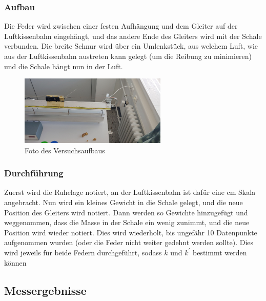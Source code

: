 \documentclass{article}
\begin{document}
          \subsubsection{Aufbau}
              Die Feder wird zwischen einer festen Aufhängung und dem Gleiter auf der Luftkissenbahn eingehängt, und das andere Ende des Gleiters wird mit der Schale verbunden.
              Die breite Schnur wird über ein Umlenkstück, aus welchem Luft, wie aus der Luftkissenbahn austreten kann gelegt (um die Reibung zu minimieren) und die Schale hängt nun in der Luft.
              \begin{figure}[ht]\label{fig:foto_federkonstante}
                \centering
                \includegraphics[width=7cm]{fotos/federkonstante.jpg}
                \caption{Foto des Versuchsaufbaus}
            \end{figure}
          \subsubsection{Durchführung}
              Zuerst wird die Ruhelage notiert, an der Luftkissenbahn ist dafür eine cm Skala angebracht.
              Nun wird ein kleines Gewicht in die Schale gelegt, und die neue Position des Gleiters wird notiert.
              Dann werden so Gewichte hinzugefügt und weggenommen, dass die Masse in der Schale ein wenig zunimmt, und die neue Position wird wieder notiert.
              Dies wird wiederholt, bis ungefähr 10 Datenpunkte aufgenommen wurden (oder die Feder nicht weiter gedehnt werden sollte).
              Dies wird jeweils für beide Federn durchgeführt, sodass $k$ und $k^{\prime}$ bestimmt werden können
              

      \subsection{Messergebnisse}
\end{document}
